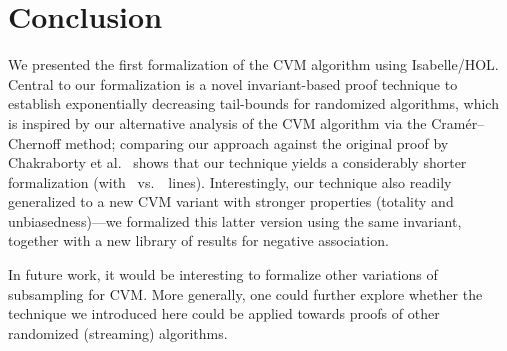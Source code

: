 \section{Conclusion}\label{sec:conclusion}
We presented the first formalization of the CVM algorithm using Isabelle/HOL.
Central to our formalization is a novel invariant-based proof technique to establish exponentially decreasing tail-bounds for randomized algorithms, which is inspired by our alternative analysis of the CVM algorithm via the Cram\'{e}r--Chernoff method; comparing our approach against the original proof by Chakraborty et al.~\cite{chakraborty2023} shows that our technique yields a considerably shorter formalization (with \locnew~vs.~\locold~lines).
Interestingly, our technique also readily generalized to a new CVM variant with stronger properties (totality and unbiasedness)---we formalized this latter version using the same invariant, together with a new library of results for negative association.

In future work, it would be interesting to formalize other variations of subsampling for CVM.
More generally, one could further explore whether the technique we introduced here could be applied towards proofs of other randomized (streaming) algorithms.
